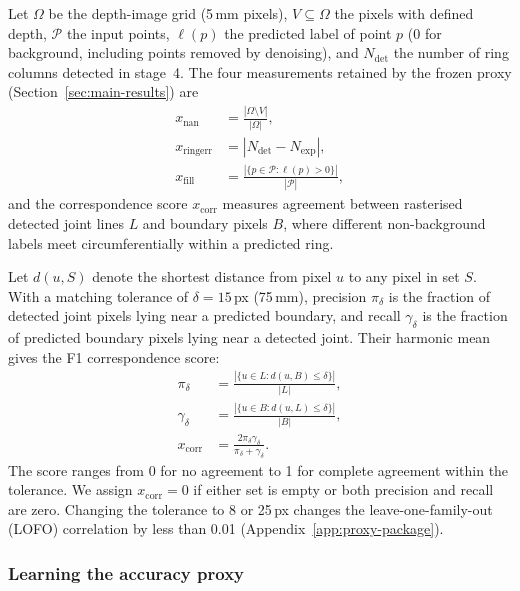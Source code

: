 \documentclass[a4paper,fleqn]{cas-dc}
\begin{document}
Let $\Omega$ be the depth-image grid (5\,mm pixels), $V\subseteq\Omega$ the pixels with defined depth, $\mathcal P$ the input points, $\ell(p)$ the predicted label of point $p$ (0 for background, including points removed by denoising), and $N_{\mathrm{det}}$ the number of ring columns detected in stage~4. The four measurements retained by the frozen proxy (Section~\ref{sec:main-results}) are
\begin{equation}
\begin{aligned}
x_{\mathrm{nan}}&=\frac{|\Omega\setminus V|}{|\Omega|},\\
x_{\mathrm{ringerr}}&=|N_{\mathrm{det}}-N_{\mathrm{exp}}|,\\
x_{\mathrm{fill}}&=\frac{|\{p\in\mathcal P:\ell(p)>0\}|}{|\mathcal P|},
\end{aligned}
\label{eq:feature-defs}
\end{equation}
and the correspondence score $x_{\mathrm{corr}}$ measures agreement between rasterised detected joint lines $L$ and boundary pixels $B$, where different non-background labels meet circumferentially within a predicted ring. 

Let $d(u,S)$ denote the shortest distance from pixel $u$ to any pixel in set $S$. With a matching tolerance of $\delta=15$\,px (75\,mm), precision $\pi_\delta$ is the fraction of detected joint pixels lying near a predicted boundary, and recall $\gamma_\delta$ is the fraction of predicted boundary pixels lying near a detected joint. Their harmonic mean gives the F1 correspondence score:
\begin{equation}
\begin{aligned}
\pi_\delta&=\frac{|\{u\in L: d(u,B)\le\delta\}|}{|L|},\\
\gamma_\delta&=\frac{|\{u\in B: d(u,L)\le\delta\}|}{|B|},\\
x_{\mathrm{corr}}&=\frac{2\pi_\delta\gamma_\delta}{\pi_\delta+\gamma_\delta}.
\end{aligned}
\label{eq:corr-f1}
\end{equation}
The score ranges from 0 for no agreement to 1 for complete agreement within the tolerance. We assign $x_{\mathrm{corr}}=0$ if either set is empty or both precision and recall are zero. Changing the tolerance to 8 or 25\,px changes the leave-one-family-out (LOFO) correlation by less than 0.01 (Appendix~\ref{app:proxy-package}).

\subsubsection{Learning the accuracy proxy}
\label{sec:ridge-proxy}
\end{document}
